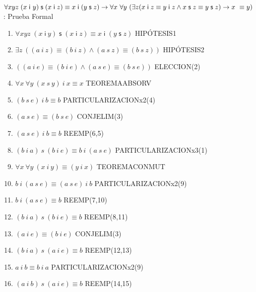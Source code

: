 \documentclass[10pt]{beamer}
\newcounter{saveenumi}
\newcommand{\seti}{\setcounter{saveenumi}{\value{enumi}}}
\newcommand{\Cfonta}{\fontsize{6.7}{9.5}\selectfont}
\newcommand{\Cfont}{\fontsize{5.5}{7.2}\selectfont}
\newcommand{\Cfonti}{\fontsize{8.5}{7.2}\selectfont}
\newcommand{\Nand}{\wedge}
\newcommand{\idistr}{\forall xyz\;(x\;\mathsf{i}\
y)\;\mathsf{s}\;(x\;\mathsf{i}\;z)\equiv x\;\mathsf{i}\;(y\;\mathsf{s}%
\;z)}
\newcommand{\myconj}{x\;\mathsf{i}\;z\equiv y\;\mathsf{%
i}\;z\wedge x\;\mathsf{s}\;z\equiv y\;\mathsf{s}\;z}
\begin{document}
\begin{frame}{\Cfonti$\idistr \rightarrow \forall x\ \forall y\ (\exists z (\myconj) \rightarrow x\ \equiv y)$:
    Prueba Formal
}
\Cfont
  \begin{enumerate}[<+->]
    \Cfonta
    \item $ \idistr $ \hfill HIPÓTESIS1
    \item $ \exists z\ ((a\ i\ z) \equiv (b\ i\ z) \Nand (a\ s\ z) \equiv (b\ s\ z))$ \hfill HIPÓTESIS2
    \item $ ((a\ i\ e) \equiv (b\ i\ e) \Nand (a\ s\ e) \equiv (b\ s\ e))$ \hfill ELECCION(2)
    \item $ \forall x\ \forall y\ (x\ s\ y)\ i\ x \equiv x$ \hfill TEOREMAABSORV
    \item $ (b\ s\ e)\ i\ b \equiv b$ \hfill PARTICULARIZACIONx2(4)
    \item $ (a\ s\ e) \equiv (b\ s\ e) $ \hfill CONJELIM(3)

    \item $ (a\ s\ e)\ i\ b \equiv b$ \hfill REEMP(6,5)
    \item $ (b\ i\ a)\ s\ (b\ i\ e) \equiv b\ i\ (a\ s\ e) $ \hfill PARTICULARIZACIONx3(1)
    \item $\forall x\ \forall y\ (x\ i\ y) \equiv (y\ i\ x)$ \hfill TEOREMACONMUT
    \item $b\ i\ (a\ s\ e) \equiv (a\ s\ e)\ i\ b $ \hfill PARTICULARIZACIONx2(9)
    \item $ b\ i\ (a\ s\ e) \equiv b$ \hfill REEMP(7,10)
    \item $ (b\ i\ a)\ s\ (b\ i\ e) \equiv b$ \hfill REEMP(8,11)
    \item $ (a\ i\ e) \equiv (b\ i\ e) $ \hfill CONJELIM(3)

    \item $ (b\ i\ a)\ s\ (a\ i\ e) \equiv b$ \hfill REEMP(12,13)
    \item $a\ i\ b \equiv b\ i\ a $ \hfill PARTICULARIZACIONx2(9)

    \item $ (a\ i\ b)\ s\ (a\ i\ e) \equiv b$ \hfill REEMP(14,15)
    \seti


  \end{enumerate}
  \setcounter{equation}{0}

\end{frame}
\end{document}
